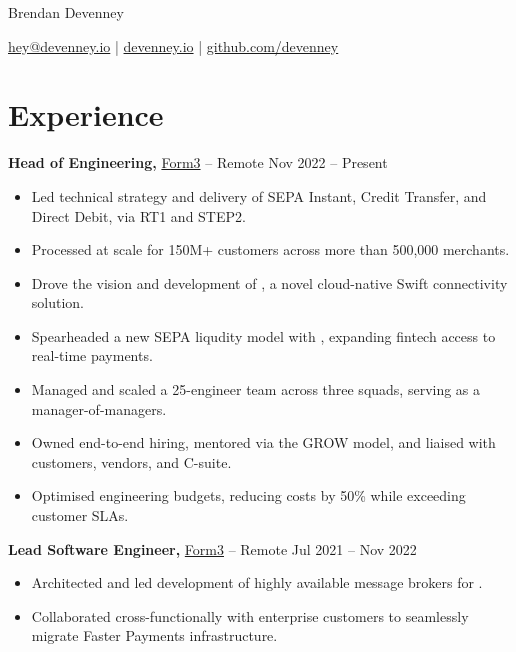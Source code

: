 \documentclass[11pt]{article}       %
\begin{document}
\centerline{\Huge Brendan Devenney}

\vspace{5pt}

\centerline{\href{mailto:hey@devenney.io}{hey@devenney.io} | \href{https://devenney.io}{devenney.io} | \href{https://github.com/devenney}{github.com/devenney}}

\vspace{-10pt}

\section*{Experience}

\textbf{Head of Engineering,} \href{https://form3.tech/}{Form3} -- Remote \hfill Nov 2022 -- Present \\
\vspace{-9pt}
\begin{itemize}
  \item Led technical strategy and delivery of SEPA Instant, Credit Transfer, and Direct Debit, via RT1 and STEP2. \\
  \item Processed  at scale for 150M+ customers across more than 500,000 merchants. \\
  \item Drove the vision and development of , a novel cloud-native Swift connectivity solution. \\
  \item Spearheaded a new SEPA liqudity model with , expanding fintech access to real-time payments. \\
  \item Managed and scaled a 25-engineer team across three squads, serving as a manager-of-managers. \\
  \item Owned end-to-end hiring, mentored via the GROW model, and liaised with customers, vendors, and C-suite. \\
  \item Optimised engineering budgets, reducing costs by 50\% while exceeding customer SLAs. \\
\end{itemize}

\textbf{Lead Software Engineer,} \href{https://form.tech/}{Form3} -- Remote \hfill Jul 2021 -- Nov 2022 \\
\vspace{-9pt}
\begin{itemize}
  \item Architected and led development of highly available message brokers for . \\
  \item Collaborated cross-functionally with enterprise customers to seamlessly migrate Faster Payments infrastructure. \\
\end{itemize}
\end{document}
